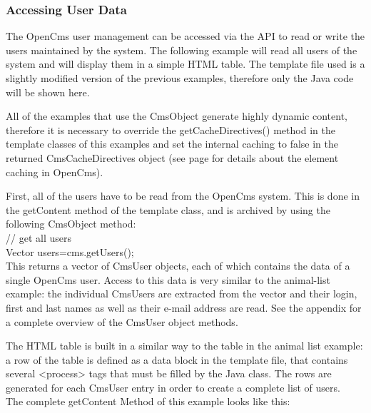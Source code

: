 \subsubsection{Accessing User Data}
The OpenCms user management can be accessed via the API to read or
write the users maintained by the system. The following example will
read all users of the system and will display them in a simple HTML
table. The template file used is a slightly modified version of the
previous examples, therefore only the Java code will be shown here.

All of the examples that use the CmsObject generate highly dynamic
content, therefore it is necessary to override the {\meth getCacheDirectives()} 
method in the template classes of this examples and set the internal caching
to false in the returned {\class CmsCacheDirectives} 
object (see page \pageref{element cache} for details about the element caching in OpenCms).

First, all of the users have to be read from the OpenCms system. This
is done in the {\meth getContent} method of the template class, and is archived
by using the following {\meth CmsObject} method:\\


{\meth // get all users\\

Vector users=cms.getUsers();}\\

This returns a vector of {\name CmsUser} objects, each of which contains the
data of a single OpenCms user. Access to this data is very similar to
the animal-list example: the individual {\name CmsUsers} are extracted from the
vector and their login, first and last names as well as their e-mail
address are read. See the appendix for a complete overview of the
{\name CmsUser} object methods.

The HTML table is built in a similar way to the table in the animal
list example: a row of the table is defined as a data block in the
template file, that contains several {\tag <process>} tags that must be
filled by the Java class. The rows are generated for each {\name CmsUser}
entry in order to create a complete list of users.\\

The complete getContent Method of this example looks like this:\\

